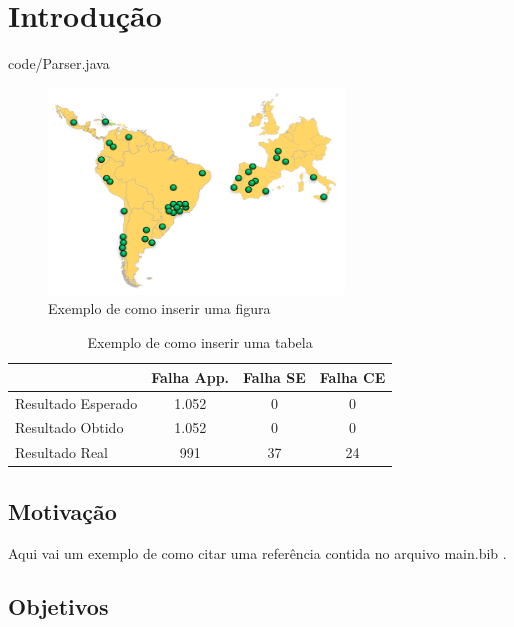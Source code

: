 \chapter{Introdução} \label{intro}

\lstset{language=Java}
 {code/Parser.java}

\begin{figure}
\centering
\caption{Exemplo de como inserir uma figura}\label{fig:eela}
\includegraphics[width=0.7\textwidth]{images/eela.png}
\end{figure}


\begin{table}
\centering
\caption{Exemplo de como inserir uma tabela}\label{tab:exp-app}
\begin{tabular}{ | l | c | c | c |}\hline
 				   & Falha App. & Falha SE & Falha CE\\\hline
Resultado Esperado & 1.052       & 0        & 0       \\\hline 
Resultado Obtido   & 1.052       & 0        & 0       \\\hline 
Resultado Real  & 991        & 37       & 24      \\\hline 
\end{tabular}
\end{table}


\section{Motivação}\label{sec:motiva}

Aqui vai um exemplo de como citar uma referência contida no arquivo main.bib \cite{nakada2007job}.

\section{Objetivos}

